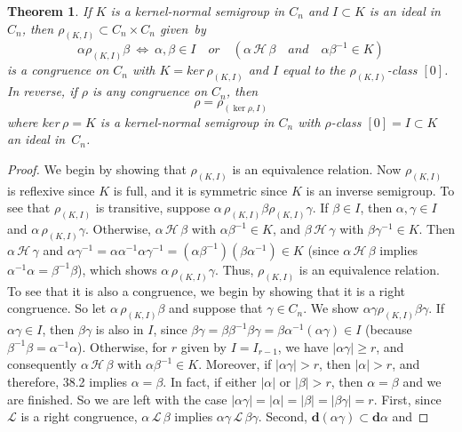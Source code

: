 \documentclass{surv-l}
\numberwithin{equation}{section}
\numberwithin{table}{section}
\numberwithin{figure}{section}
\newtheorem{theorem}[equation]{Theorem}
\theoremstyle{definition}
\begin{document}
\begin{theorem}\label{thm8.38.3}
If $K$ is a kernel-normal semigroup in $C_{n}$ and $I \subset K$
is an ideal in $C_{n}$, then $\rho_{(K,I)}\subset C_{n}\times
C_{n}$ given~by
\[
\alpha\rho_{(K,I)}\beta\ \Leftrightarrow\ \alpha,\beta\in I\quad
or\quad (\alpha\,\mathcal{H}\,\beta\quad and\quad \alpha\beta^{-1}\in K)
\]
is a congruence on $C_{n}$ with $K=ker\,\rho_{(K,I)}$ and $I$ equal
to the $\rho_{(K,I)}$-class $[0]$. In reverse, if $\rho$ is any
congruence on $C_{n}$, then
\[
\rho=\rho_{(\ker \rho,I)}
\]
where $ker\,\rho=K$ is a kernel-normal semigroup in $C_{n}$ with
$\rho$-class $[0]=I \subset K$ an ideal in~$C_{n}$.
\end{theorem}

\begin{proof} We begin by showing that $\rho_{(K,I)}$ is an equivalence
relation. Now $\rho_{(K,I)}$ is reflexive since $K$ is full, and
it is symmetric since $K$ is an inverse semigroup. To see that
$\rho_{(K,I)}$ is transitive, suppose
$\alpha\,\rho_{(K,I)}\beta\rho_{(K,I)}\gamma$. If $\beta\in I$, then
$\alpha,\gamma\in I$ and $\alpha\,\rho_{(K,I)}\gamma$. Otherwise,
$\alpha\,\mathcal{H}\,\beta$ with $\alpha\beta^{-1}\in K$, and $\beta\,
\mathcal{H}\,\gamma$ with $\beta\gamma^{-1}\in K$. Then $\alpha\,
\mathcal{H}\,\gamma$ and
$\alpha\gamma^{-1}=\alpha\alpha^{-1}\alpha\gamma^{-1}=(\alpha\beta^{-1})(\beta\alpha^{-1})\in
K$ (since $\alpha\,\mathcal{H}\,\beta$ implies
$\alpha^{-1}\alpha=\beta^{-1}\beta$), which shows
$\alpha\,\rho_{(K,I)}\gamma$. Thus, $\rho_{(K,I)}$ is an equivalence
relation. To see that it is also a congruence, we begin by showing
that it is a right congruence. So let $\alpha\,\rho_{(K,I)}\beta$
and suppose that $\gamma\in C_{n}$. We show
$\alpha\gamma\rho_{(K,I)}\beta\gamma$. If $\alpha\gamma\in I$,
then $\beta\gamma$ is also in $I$, since
$\beta\gamma=\beta\beta^{-1}\beta\gamma=\beta\alpha^{-1}(\alpha\gamma)\in
I$ (because $\beta^{-1}\beta=\alpha^{-1}\alpha$). Otherwise, for
$r$ given by $I=I_{r-1}$, we have $|\alpha\gamma|\geq r$, and
consequently $\alpha\,\mathcal{H}\,\beta$ with $\alpha\beta^{-1}\in
K$. Moreover, if $|\alpha\gamma|>r$, then $|\alpha|>r$, and
therefore, 38.2 implies $\alpha=\beta$. In fact, if either
$|\alpha|$ or $|\beta|>r$, then $\alpha=\beta$ and we are
finished. So we are left with the case
$|\alpha\gamma|=|\alpha|=|\beta|=|\beta\gamma|=r$. First, since
$\mathcal{L}$ is a right congruence, $\alpha\,\mathcal{L}\,\beta$
implies $\alpha\gamma\,\mathcal{L}\,\beta\gamma$. Second,
$\mathbf{d}(\alpha\gamma)\subset \mathbf{d}\alpha$ and

\end{proof}
\end{document}
